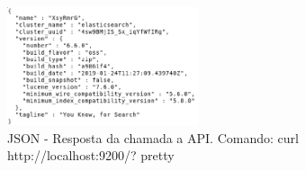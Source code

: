 \begin{figure}[!htb]
        \caption{\label{pretty}JSON - Resposta da chamada a API. Comando: curl http://localhost:9200/?   pretty}
        \begin{center}
                \includegraphics[width=0.5\textwidth, height=0.35\textheight]{imagens/pretty.eps}
        \end{center}
\end{figure}

